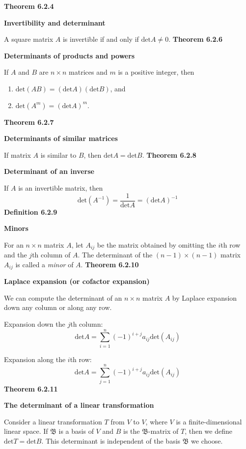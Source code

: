 \textbf{Theorem 6.2.4}\\
\par\noindent\textbf{Invertibility and determinant}
\par\noindent A square matrix $A$ is invertible if and only if $\textrm{det}A\ne{}0$.
\textbf{Theorem 6.2.6}\\
\par\noindent\textbf{Determinants of products and powers}
\par\noindent If $A$ and $B$ are $n\times{}n$ matrices and $m$ is a positive integer, then
\renewcommand{\labelenumi}{\textbf{\alph{enumi}.}}
\begin{enumerate}
\item $\textrm{det}(AB)=(\textrm{det}A)(\textrm{det}B)$, and
\item $\textrm{det}(A^{m})=(\textrm{det}A)^{m}$.
\end{enumerate}
\textbf{Theorem 6.2.7}\\
\par\noindent\textbf{Determinants of similar matrices}
\par\noindent If matrix $A$ is similar to $B$, then $\textrm{det}A=\textrm{det}B$.
\textbf{Theorem 6.2.8}\\
\par\noindent\textbf{Determinant of an inverse}
\par\noindent If $A$ is an invertible matrix, then
\[\textrm{det}(A^{-1})=\frac{1}{\textrm{det}A}=(\textrm{det}A)^{-1}\]
\textbf{Definition 6.2.9}\\
\par\noindent\textbf{Minors}
\par\noindent For an $n\times{}n$ matrix $A$, let $A_{ij}$ be the matrix obtained by omitting the $i$th row and the $j$th column of $A$. The determinant of the $(n-1)\times{}(n-1)$ matrix $A_{ij}$ is called a \textit{minor} of $A$.
\textbf{Theorem 6.2.10}\\
\par\noindent\textbf{Laplace expansion (or cofactor expansion)}
\par\noindent We can compute the determinant of an $n\times{}n$ matrix $A$ by Laplace expansion down any column or along any row.
\par Expansion down the $j$th column:
\[\textrm{det}A=\sum_{i=1}^{n}(-1)^{i+j}a_{ij}\textrm{det}(A_{ij})\]
\par Expansion along the $i$th row:
\[\textrm{det}A=\sum_{j=1}^{n}(-1)^{i+j}a_{ij}\textrm{det}(A_{ij})\]
\textbf{Theorem 6.2.11}\\
\par\noindent\textbf{The determinant of a linear transformation}
\par\noindent Consider a linear transformation $T$ from $V$ to $V$, where $V$ is a finite-dimensional linear space. If $\mathfrak{B}$ is a basis of $V$ and $B$ is the $\mathfrak{B}$-matrix of $T$, then we define $\textrm{det}T=\textrm{det}B$. This determinant is independent of the basis $\mathfrak{B}$ we choose.

